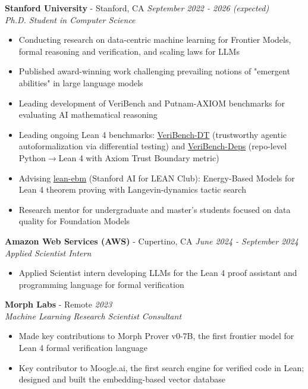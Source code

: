 \documentclass{article}
\newenvironment{changemargin}[2]{%
  \begin{list}{}{%
    \setlength{\topsep}{0pt}%
    \setlength{\leftmargin}{#1}%
    \setlength{\rightmargin}{#2}%
    \setlength{\listparindent}{\parindent}%
    \setlength{\itemindent}{\parindent}%
    \setlength{\parsep}{\parskip}%
  }%
  \item[]}{\end{list}
}
\newenvironment{body} {
	\vspace*{-16pt}
	\begin{changemargin}{-0.25in}{-0.5in}
  }	
	{\end{changemargin}
}
\begin{document}
\begin{body}
	\vspace{16pt}
 
    \textbf{Stanford University} - Stanford, CA \hfill \emph{September 2022 - 2026 (expected)}\\
	\emph{Ph.D. Student in Computer Science}\\
	\vspace*{-3pt}
	\begin{itemize} \itemsep -2pt  %
		\item Conducting research on data-centric machine learning for Frontier Models, formal reasoning and verification, and scaling laws for LLMs
		\item Published award-winning work challenging prevailing notions of "emergent abilities" in large language models
		\item Leading development of VeriBench and Putnam-AXIOM benchmarks for evaluating AI mathematical reasoning
		\item Leading ongoing Lean 4 benchmarks: \href{https://github.com/brando90/veribench-dt}{VeriBench-DT} (trustworthy agentic autoformalization via differential testing) and \href{https://github.com/brando90/veribench-deps}{VeriBench-Deps} (repo-level Python$\to$Lean 4 with Axiom Trust Boundary metric)
		\item Advising \href{https://github.com/Stanford-AI-for-LEAN-Club/lean-ebm}{lean-ebm} (Stanford AI for LEAN Club): Energy-Based Models for Lean 4 theorem proving with Langevin-dynamics tactic search
		\item Research mentor for undergraduate and master's students focused on data quality for Foundation Models
	\end{itemize}
	\vspace{5 pt}

    \textbf{Amazon Web Services (AWS)} - Cupertino, CA \hfill \emph{June 2024 - September 2024}\\
	\emph{Applied Scientist Intern}\\
	\vspace*{-3pt}
	\begin{itemize} \itemsep -2pt
		\item Applied Scientist intern developing LLMs for the Lean 4 proof assistant and programming language for formal verification
	\end{itemize}
	\vspace{5 pt}

    \textbf{Morph Labs} - Remote \hfill \emph{2023}\\
	\emph{Machine Learning Research Scientist Consultant}\\
	\vspace*{-3pt}
	\begin{itemize} \itemsep -2pt
		\item Made key contributions to Morph Prover v0-7B, the first frontier model for Lean 4 formal verification language
		\item Key contributor to Moogle.ai, the first search engine for verified code in Lean; designed and built the embedding-based vector database
	\end{itemize}
	\vspace{5 pt}
	

\end{body}
\end{document}
